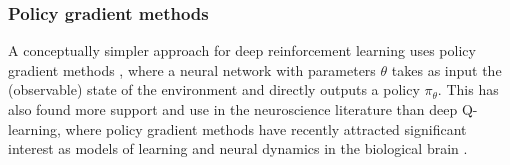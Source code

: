 
\subsubsection*{Policy gradient methods}

A conceptually simpler approach for deep reinforcement learning uses policy gradient methods \citep{sutton2018reinforcement}, where a neural network with parameters $\theta$ takes as input the (observable) state of the environment and directly outputs a policy $\pi_\theta$.
This has also found more support and use in the neuroscience literature than deep Q-learning, where policy gradient methods have recently attracted significant interest as models of learning and neural dynamics in the biological brain \citep{wang2018prefrontal, jensen2023recurrent, merel2019deep, song2017reward}.


